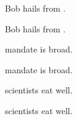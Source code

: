 \documentclass{article}
\begin{document}
Bob hails from . \par
Bob hails from .


 mandate is broad. \par
{} mandate is broad.


 scientists eat well. \par
{} scientists eat well. \par
\end{document}
